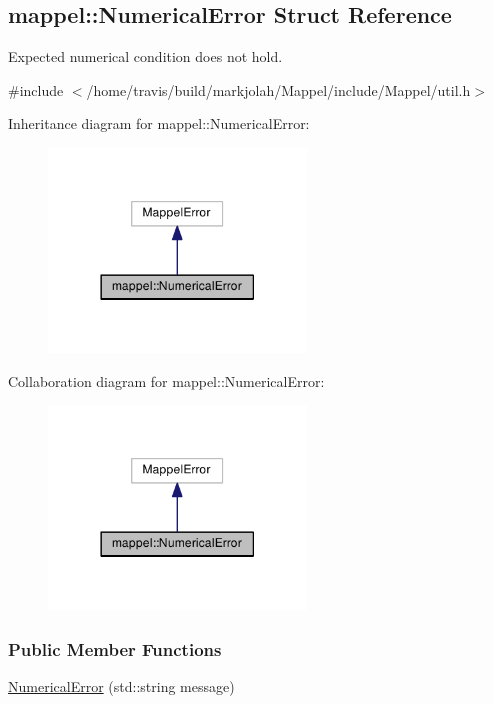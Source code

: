 \hypertarget{structmappel_1_1NumericalError}{}\subsection{mappel\+:\+:Numerical\+Error Struct Reference}
\label{structmappel_1_1NumericalError}


Expected numerical condition does not hold.  




{\ttfamily \#include $<$/home/travis/build/markjolah/\+Mappel/include/\+Mappel/util.\+h$>$}



Inheritance diagram for mappel\+:\+:Numerical\+Error\+:\nopagebreak
\begin{figure}[H]
\begin{center}
\leavevmode
\includegraphics[width=194pt]{structmappel_1_1NumericalError__inherit__graph}
\end{center}
\end{figure}


Collaboration diagram for mappel\+:\+:Numerical\+Error\+:\nopagebreak
\begin{figure}[H]
\begin{center}
\leavevmode
\includegraphics[width=194pt]{structmappel_1_1NumericalError__coll__graph}
\end{center}
\end{figure}
\subsubsection*{Public Member Functions}
\begin{DoxyCompactItemize}
\item 
\hyperlink{structmappel_1_1NumericalError_ab82f79710238ed6d9710b53459b28e40}{Numerical\+Error} (std\+::string message)
\end{DoxyCompactItemize}


